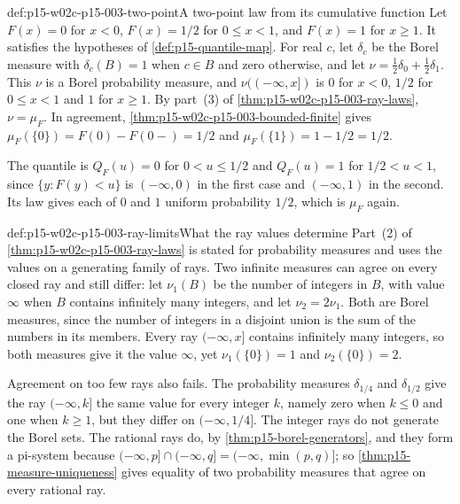 \begin{hbexample}{def:p15-w02c-p15-003-two-point}{A two-point law from its cumulative function}
Let \(F(x)=0\) for \(x<0\), \(F(x)=1/2\) for \(0\leq x<1\), and
\(F(x)=1\) for \(x\geq1\). It satisfies the hypotheses of
\cref{def:p15-quantile-map}. For real \(c\), let \(\delta_c\) be the
Borel measure with \(\delta_c(B)=1\) when \(c\in B\) and zero otherwise,
and let \(\nu=\tfrac12\delta_0+\tfrac12\delta_1\). This \(\nu\) is a
Borel probability measure, and \(\nu((-\infty,x])\) is \(0\) for
\(x<0\), \(1/2\) for \(0\leq x<1\) and \(1\) for \(x\geq1\). By part~(3)
of \cref{thm:p15-w02c-p15-003-ray-laws}, \(\nu=\mu_F\). In agreement,
\cref{thm:p15-w02c-p15-003-bounded-finite} gives
\(\mu_F(\{0\})=F(0)-F(0-)=1/2\) and \(\mu_F(\{1\})=1-1/2=1/2\).

The quantile is \(Q_F(u)=0\) for \(0<u\leq1/2\) and \(Q_F(u)=1\) for
\(1/2<u<1\), since \(\{y:F(y)<u\}\) is \((-\infty,0)\) in the first
case and \((-\infty,1)\) in the second. Its law gives each of \(0\) and
\(1\) uniform probability \(1/2\), which is \(\mu_F\) again.
\end{hbexample}

\begin{hbwarning}{def:p15-w02c-p15-003-ray-limits}{What the ray values determine}
Part~(2) of \cref{thm:p15-w02c-p15-003-ray-laws} is stated for probability
measures and uses the values on a generating family of rays. Two infinite
measures can agree on every closed ray and still differ: let
\(\nu_1(B)\) be the number of integers in \(B\), with value
\(\infty\) when \(B\) contains infinitely many integers, and let
\(\nu_2=2\nu_1\). Both are Borel measures, since the number of integers
in a disjoint union is the sum of the numbers in its members. Every ray \((-\infty,x]\) contains infinitely
many integers, so both measures give it the value \(\infty\), yet
\(\nu_1(\{0\})=1\) and \(\nu_2(\{0\})=2\).

Agreement on too few rays also fails. The probability measures
\(\delta_{1/4}\) and \(\delta_{1/2}\) give the ray \((-\infty,k]\) the
same value for every integer \(k\), namely zero when \(k\leq0\) and one
when \(k\geq1\), but they differ on \((-\infty,1/4]\). The integer rays do
not generate the Borel sets. The rational rays do, by
\cref{thm:p15-borel-generators}, and they form a pi-system because
\((-\infty,p]\cap(-\infty,q]=(-\infty,\min(p,q)]\); so
\cref{thm:p15-measure-uniqueness} gives equality of two probability
measures that agree on every rational ray.
\end{hbwarning}


